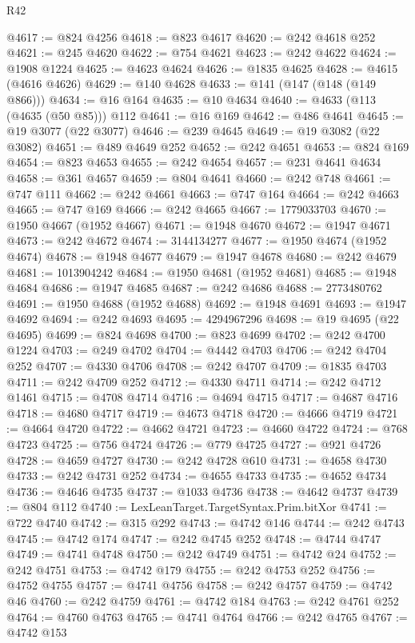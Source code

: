 \begin{lexlean}{R42}
\begin{coremodule}
{@4617 := @824 @4256
@4618 := @823 @4617
@4620 := @242 @4618 @252
@4621 := @245 @4620
@4622 := @754 @4621
@4623 := @242 @4622
@4624 := @1908 @1224
@4625 := @4623 @4624
@4626 := @1835 @4625
@4628 := @4615 (@4616 @4626)
@4629 := @140 @4628
@4633 := @141 (@147 (@148 (@149 @866)))
@4634 := @16 @164
@4635 := @10 @4634
@4640 := @4633 (@113 (@4635 (@50 @85))) @112
@4641 := @16 @169
@4642 := @486 @4641
@4645 := @19 @3077 (@22 @3077)
@4646 := @239 @4645
@4649 := @19 @3082 (@22 @3082)
@4651 := @489 @4649 @252
@4652 := @242 @4651
@4653 := @824 @169
@4654 := @823 @4653
@4655 := @242 @4654
@4657 := @231 @4641 @4634
@4658 := @361 @4657
@4659 := @804 @4641
@4660 := @242 @748
@4661 := @747 @111
@4662 := @242 @4661
@4663 := @747 @164
@4664 := @242 @4663
@4665 := @747 @169
@4666 := @242 @4665
@4667 := 1779033703
@4670 := @1950 @4667 (@1952 @4667)
@4671 := @1948 @4670
@4672 := @1947 @4671
@4673 := @242 @4672
@4674 := 3144134277
@4677 := @1950 @4674 (@1952 @4674)
@4678 := @1948 @4677
@4679 := @1947 @4678
@4680 := @242 @4679
@4681 := 1013904242
@4684 := @1950 @4681 (@1952 @4681)
@4685 := @1948 @4684
@4686 := @1947 @4685
@4687 := @242 @4686
@4688 := 2773480762
@4691 := @1950 @4688 (@1952 @4688)
@4692 := @1948 @4691
@4693 := @1947 @4692
@4694 := @242 @4693
@4695 := 4294967296
@4698 := @19 @4695 (@22 @4695)
@4699 := @824 @4698
@4700 := @823 @4699
@4702 := @242 @4700 @1224
@4703 := @249 @4702
@4704 := @4442 @4703
@4706 := @242 @4704 @252
@4707 := @4330 @4706
@4708 := @242 @4707
@4709 := @1835 @4703
@4711 := @242 @4709 @252
@4712 := @4330 @4711
@4714 := @242 @4712 @1461
@4715 := @4708 @4714
@4716 := @4694 @4715
@4717 := @4687 @4716
@4718 := @4680 @4717
@4719 := @4673 @4718
@4720 := @4666 @4719
@4721 := @4664 @4720
@4722 := @4662 @4721
@4723 := @4660 @4722
@4724 := @768 @4723
@4725 := @756 @4724
@4726 := @779 @4725
@4727 := @921 @4726
@4728 := @4659 @4727
@4730 := @242 @4728 @610
@4731 := @4658 @4730
@4733 := @242 @4731 @252
@4734 := @4655 @4733
@4735 := @4652 @4734
@4736 := @4646 @4735
@4737 := @1033 @4736
@4738 := @4642 @4737
@4739 := @804 @112
@4740 := LexLeanTarget.TargetSyntax.Prim.bitXor
@4741 := @722 @4740
@4742 := @315 @292
@4743 := @4742 @146
@4744 := @242 @4743
@4745 := @4742 @174
@4747 := @242 @4745 @252
@4748 := @4744 @4747
@4749 := @4741 @4748
@4750 := @242 @4749
@4751 := @4742 @24
@4752 := @242 @4751
@4753 := @4742 @179
@4755 := @242 @4753 @252
@4756 := @4752 @4755
@4757 := @4741 @4756
@4758 := @242 @4757
@4759 := @4742 @46
@4760 := @242 @4759
@4761 := @4742 @184
@4763 := @242 @4761 @252
@4764 := @4760 @4763
@4765 := @4741 @4764
@4766 := @242 @4765
@4767 := @4742 @153
}
\end{coremodule}
\end{lexlean}
